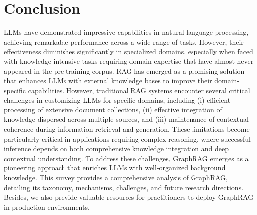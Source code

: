 \documentclass[lettersize,journal]{IEEEtran}
\begin{document}



\section{Conclusion}
LLMs have demonstrated impressive capabilities in natural language processing, achieving remarkable performance across a wide range of tasks. However, their effectiveness diminishes significantly in specialized domains, especially when faced with knowledge-intensive tasks requiring domain expertise that have almost never appeared in the pre-training corpus. 
RAG has emerged as a promising solution that enhances LLMs with external knowledge bases to improve their domain-specific capabilities. However, traditional RAG systems encounter several critical challenges in customizing LLMs for specific domains, including (i) efficient processing of extensive document collections, (ii) effective integration of knowledge dispersed across multiple sources, and (iii) maintenance of contextual coherence during information retrieval and generation. 
These limitations become particularly critical in applications requiring complex reasoning, where successful inference depends on both comprehensive knowledge integration and deep contextual understanding. To address these challenges, GraphRAG emerges as a pioneering approach that enriches LLMs with well-organized background knowledge. This survey provides a comprehensive analysis of GraphRAG, detailing its taxonomy, mechanisms, challenges, and future research directions. Besides, we also provide valuable resources for practitioners to deploy GraphRAG in production environments.
\end{document}
